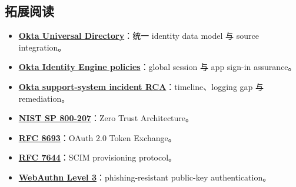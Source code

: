 \subsection{拓展阅读}

{\small
\begin{itemize}[nosep,leftmargin=*]
  \item \href{https://developer.okta.com/docs/concepts/universal-directory/}{\textbf{Okta Universal Directory}}：统一 identity data model 与 source integration。
  \item \href{https://help.okta.com/oie/en-us/content/topics/identity-engine/policies/about-policies.htm}{\textbf{Okta Identity Engine policies}}：global session 与 app sign-in assurance。
  \item \href{https://sec.okta.com/articles/2023/11/unauthorized-access-oktas-support-case-management-system-root-cause/}{\textbf{Okta support-system incident RCA}}：timeline、logging gap 与 remediation。
  \item \href{https://csrc.nist.gov/pubs/sp/800/207/final}{\textbf{NIST SP 800-207}}：Zero Trust Architecture。
  \item \href{https://www.rfc-editor.org/rfc/rfc8693}{\textbf{RFC 8693}}：OAuth 2.0 Token Exchange。
  \item \href{https://www.rfc-editor.org/rfc/rfc7644}{\textbf{RFC 7644}}：SCIM provisioning protocol。
  \item \href{https://www.w3.org/TR/webauthn-3/}{\textbf{WebAuthn Level 3}}：phishing-resistant public-key authentication。
\end{itemize}
}


